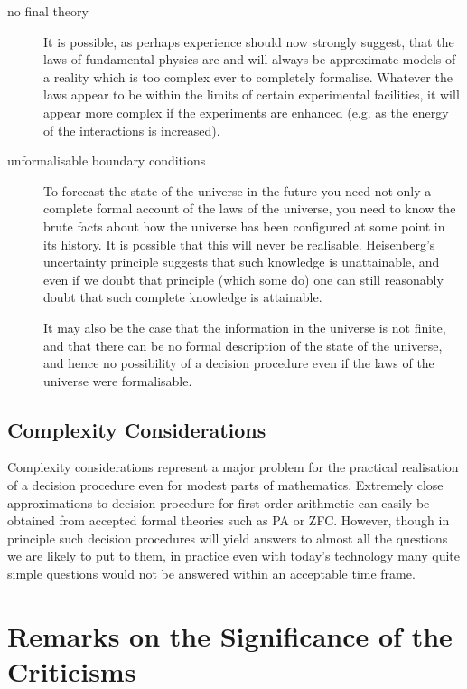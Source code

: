 \documentclass{rbjk}
\begin{document}
\begin{article}
\begin{description}
\item[no final theory]

It is possible, as perhaps experience should now strongly suggest, that the laws of fundamental physics are and will always be approximate models of a reality which is too complex ever to completely formalise.
Whatever the laws appear to be within the limits of certain experimental facilities, it will appear more complex if the experiments are enhanced (e.g. as the energy of the interactions is increased).

\item[unformalisable boundary conditions]

To forecast the state of the universe in the future you need not only a complete formal account of the laws of the universe, you need to know the brute facts about how the universe has been configured at some point in its history.
It is possible that this will never be realisable.
Heisenberg's uncertainty principle suggests that such knowledge is unattainable, and even if we doubt that principle (which some do) one can still reasonably doubt that such complete knowledge is attainable.

It may also be the case that the information in the universe is not finite, and that there can be no formal description of the state of the universe, and hence no possibility of a decision procedure even if the laws of the universe were formalisable.

\end{description}

\subsection{Complexity Considerations}

Complexity considerations represent a major problem for the practical realisation of a decision procedure even for modest parts of mathematics.
Extremely close approximations to decision procedure for first order arithmetic can easily be obtained from accepted formal theories such as PA or ZFC.
However, though in principle such decision procedures will yield answers to almost all the questions we are likely to put to them, in practice even with today's technology many quite simple questions would not be answered within an acceptable time frame.

\section{Remarks on the Significance of the Criticisms}


\end{article}
\end{document}
